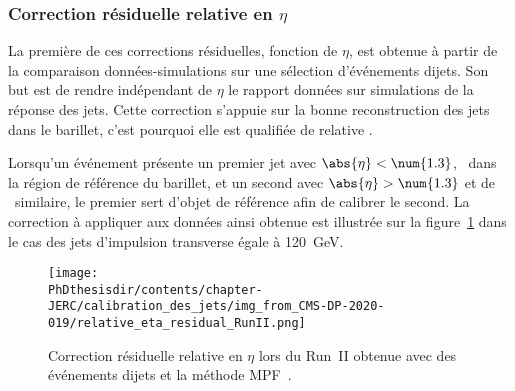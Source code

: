 \subsubsection{Correction résiduelle relative en $\eta$}\label{chapter-JERC-section-CMS-subsec-residuals_eta}
La première de ces corrections résiduelles, fonction de $\eta$, est obtenue à partir de la comparaison données-simulations sur une sélection d'événements dijets.
Son but est de rendre indépendant de $\eta$ le rapport données sur simulations de la réponse des jets.
Cette correction s'appuie sur la bonne reconstruction des jets dans le barillet, c'est pourquoi elle est qualifiée de \og relative \fg.
\par Lorsqu'un événement présente un premier jet avec $\abs{\eta}<\num{1.3}$, \ie\ dans la région de référence du barillet, et un second avec $\abs{\eta}>\num{1.3}$ et de \pT\ similaire, le premier sert d'objet de référence afin de calibrer le second.
La correction à appliquer aux données ainsi obtenue est illustrée sur la figure~\ref{fig-L2ResRel_RunII} dans le cas des jets d'impulsion transverse égale à \SI{120}{\GeV}.
\begin{figure}[h]
\centering
\texttt{[image: \\PhDthesisdir/contents/chapter-JERC/calibration\_des\_jets/img\_from\_CMS-DP-2020-019/relative\_eta\_residual\_RunII.png]}
\caption[Correction résiduelle relative en $\eta$ lors du Run~II.]{Correction résiduelle relative en $\eta$ lors du Run~II obtenue avec des événements dijets et la méthode MPF~\cite{CMS-DP-2020-019}.}
\label{fig-L2ResRel_RunII}
\end{figure}
